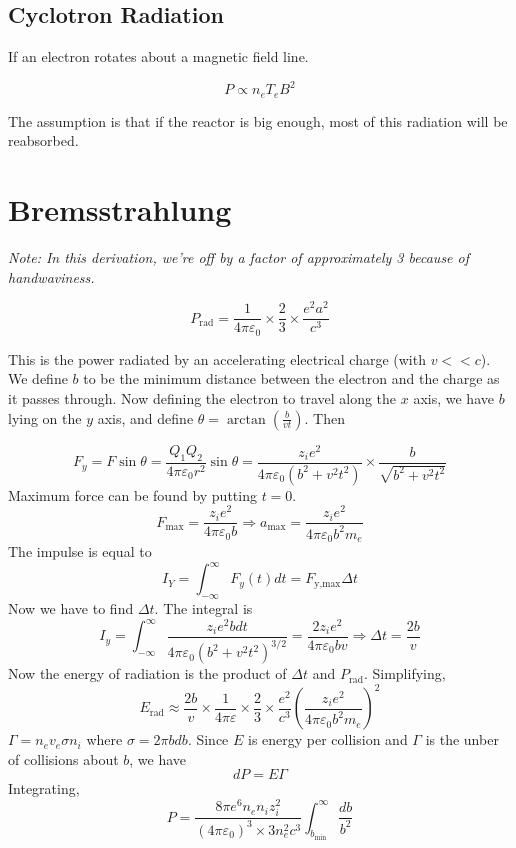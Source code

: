 \documentclass[12pt]{article}
\begin{document}
\subsection{Cyclotron Radiation}

If an electron rotates about a magnetic field line.

$$P \propto n_eT_eB^2$$

The assumption is that if the reactor is big enough, most of this radiation will be reabsorbed.

\section{Bremsstrahlung}

\textit{Note: In this derivation, we're off by a factor of approximately 3 because of handwaviness.}

\begin{equation}
    P_{\text{rad}} = \frac{1}{4\pi\varepsilon_0} \times \frac{2}{3} \times \frac{e^2a^2}{c^3}
\end{equation}

This is the power radiated by an accelerating electrical charge (with $v<<c$). We define $b$ to be the minimum distance between the electron and the charge as it passes through. Now defining the electron to travel along the $x$ axis, we have $b$ lying on the $y$ axis, and define $\theta = \arctan\left(\frac{b}{vt}\right)$. Then

$$F_y = F\sin\theta = \frac{Q_1Q_2}{4\pi\varepsilon_0r^2}\sin\theta = \frac{z_ie^2}{4\pi\varepsilon_0(b^2+v^2t^2)} \times \frac{b}{\sqrt{b^2+v^2t^2}}$$
Maximum force can be found by putting $t=0$.
$$F_{\text{max}} = \frac{z_ie^2}{4\pi\varepsilon_0b} \Rightarrow a_{\text{max}} = \frac{z_ie^2}{4\pi\varepsilon_0b^2m_e}$$
The impulse is equal to
$$I_Y = \int_{-\infty}^\infty F_y(t)dt = F_{\text{y,max}} \Delta t$$
Now we have to find $\Delta t$. The integral is
$$I_y = \int_{-\infty}^\infty \frac{z_ie^2bdt}{4\pi\varepsilon_0(b^2+v^2t^2)^{3/2}} = \frac{2z_ie^2}{4\pi\varepsilon_0bv} \Rightarrow \Delta t = \frac{2b}{v}$$
Now the energy of radiation is the product of $\Delta t$ and $P_{\text{rad}}$. Simplifying,
$$E_{\text{rad}} \approx \frac{2b}{v} \times \frac{1}{4\pi\varepsilon} \times \frac{2}{3} \times \frac{e^2}{c^3}
\left(\frac{z_ie^2}{4\pi\varepsilon_0b^2m_e}\right)^2$$
$\Gamma = n_ev_e\sigma n_i$ where $\sigma = 2\pi bdb$. Since $E$ is energy per collision and $\Gamma$ is the unber of collisions about $b$, we have
$$dP = E\Gamma$$
Integrating,
$$P = \frac{8\pi e^6n_en_iz_i^2}{(4\pi\varepsilon_0)^3\times3n_e^2c^3} \int_{b_{\text{min}}}^\infty \frac{db}{b^2}$$
\end{document}

